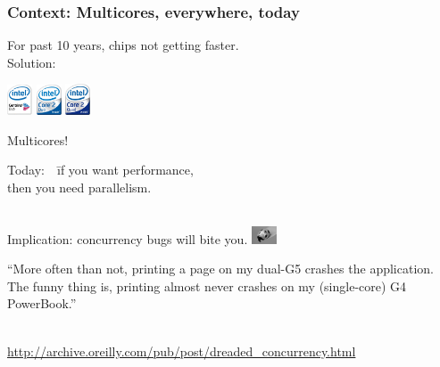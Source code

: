 \documentclass{beamer}
\newenvironment{changemargin}[1]{%
  \begin{list}{}{%
    \setlength{\topsep}{0pt}%
    \setlength{\leftmargin}{#1}%
    \setlength{\rightmargin}{1em}
    \setlength{\listparindent}{\parindent}%
    \setlength{\itemindent}{\parindent}%
    \setlength{\parsep}{\parskip}%
  }%
  \item[]}{\end{list}}
\begin{document}
\begin{frame}
\frametitle{Context: Multicores, everywhere, today}
  \begin{changemargin}{2cm}
    For past 10 years, chips not getting faster.\\[1em]
    Solution:
    \begin{center}
    \includegraphics[width=2em]{L10/centrino-duo}
    \includegraphics[width=2em]{L10/core-2-duo}
    \includegraphics[width=2em]{L10/core-2-quad}
    \end{center}

    Multicores!\\[2em]
    \begin{tabbing}
    Today:~~\=if you want performance, \\
    \>then you need parallelism.
    \end{tabbing}
    ~\\[0.5em]
    Implication: concurrency bugs will bite you. \includegraphics[width=2em]{L10/ladybug}
  \end{changemargin}

\end{frame}

\begin{frame}
  \begin{changemargin}{0cm}
    \begin{center}
    \begin{minipage}{.8\textwidth}
    {\Large \justifying
      ``More often than not, printing a page on my dual-G5 crashes the application. The funny thing is, printing almost never crashes on my (single-core) G4 PowerBook.''\\
    }
    \end{minipage}
    \end{center}~\\[1em]
    \hfill \scriptsize \url{http://archive.oreilly.com/pub/post/dreaded_concurrency.html}
  \end{changemargin}
\end{frame}
\end{document}
